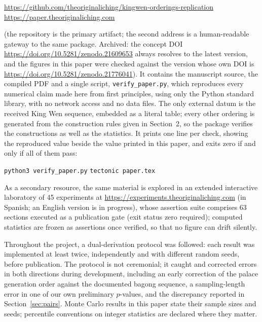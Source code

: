 \documentclass[11pt]{article}
\begin{document}
\begin{center}
\url{https://github.com/theoriginaliching/kingwen-orderings-replication}\\[0.3em]
\url{https://paper.theoriginaliching.com}
\end{center}

\noindent
(the repository is the primary artifact; the second address is a human-readable gateway to the same package. Archived: the concept DOI \url{https://doi.org/10.5281/zenodo.21609653} always resolves to the latest version, and the figures in this paper were checked against the version whose own DOI is \url{https://doi.org/10.5281/zenodo.21776041}). It contains the manuscript source, the compiled PDF and a single script, \texttt{verify\_paper.py}, which reproduces every numerical claim made here from first principles, using only the Python standard library, with no network access and no data files. The only external datum is the received King Wen sequence, embedded as a literal table; every other ordering is generated from the construction rules given in Section~2, so the package verifies the constructions as well as the statistics. It prints one line per check, showing the reproduced value beside the value printed in this paper, and exits zero if and only if all of them pass:

\begin{center}
\texttt{python3 verify\_paper.py} \qquad \texttt{tectonic paper.tex}
\end{center}

As a secondary resource, the same material is explored in an extended interactive laboratory of 45 experiments at \url{https://experiments.theoriginaliching.com} (in Spanish; an English version is in progress), whose assertion suite comprises 63 sections executed as a publication gate (exit status zero required); computed statistics are frozen as assertions once verified, so that no figure can drift silently.

Throughout the project, a dual-derivation protocol was followed: each result was implemented at least twice, independently and with different random seeds, before publication. The protocol is not ceremonial; it caught and corrected errors in both directions during development, including an early correction of the palace generation order against the documented bagong sequence, a sampling-length error in one of our own preliminary $p$-values, and the discrepancy reported in Section~\ref{sec:pairs}. Monte Carlo results in this paper state their sample sizes and seeds; percentile conventions on integer statistics are declared where they matter.
\end{document}
